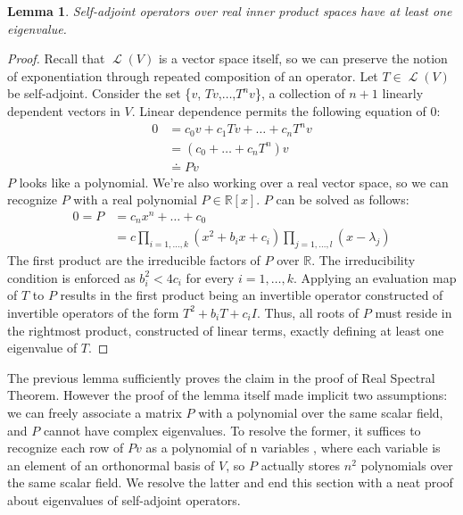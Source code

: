 \documentclass[letterpaper,12pt]{article}
\newtheorem{lemma}[theorem]{Lemma}
\newcommand{\an}[1]{{\leavevmode\color{red}{#1}}}
\begin{document}
\begin{lemma}
Self-adjoint operators over real inner product spaces have at least one eigenvalue.
\end{lemma}
\an{Again, the above is true for any matrix.}
\begin{proof}
  \an{This proof is sketchy to me; e.g., I don't get what $P$ is about, and I don't understand why irreducibility of real polynomial factors is relevant.}
Recall that $\operatorname{\mathcal{L}}(V)$ is a vector space itself, so we can preserve the notion of exponentiation through repeated composition of an operator. Let $T \in \operatorname{\mathcal{L}}(V)$ be self-adjoint. Consider the set \{$v$, $Tv$,$\dots$,$T^{n}v$\}, a collection of $n+1$ linearly dependent vectors in $V$. Linear dependence permits the following equation of 0:
\begin{align}
    0 &= c_0 v + c_1 Tv +\dots+ c_n T^{n}v\\
      &= (c_0 +\dots+c_n T^{n})v \\
      &\doteq Pv
\end{align}
$P$ looks like a polynomial. We're also working over a real vector space, so we can recognize $P$ with a real polynomial $P\in \mathbb{R}[x]$. $P$ can be solved as follows:
\begin{align}
    0 = P &= c_n x^{n} +\dots+c_0 \\
    &= c\prod_{i=1,\dots,k}(x^{2} + b_{i}x + c_{i})\prod_{j=1,\dots,l}(x-\lambda_j) 
\end{align}
The first product are the irreducible factors of $P$ over $\mathbb{R}$. The irreducibility condition is enforced as $b_{i}^{2}<4c_{i}$ for every $i=1,\dots,k$. Applying an evaluation map of $T$ to $P$ results in the first product being an invertible operator constructed of invertible operators of the form $T^{2} + b_{i}T + c_{i}I$. Thus, all roots of $P$ must reside in the rightmost product, constructed of linear terms, exactly defining at least one eigenvalue of $T$.
\end{proof}
The previous lemma sufficiently proves the claim in the proof of Real Spectral Theorem. However the proof of the lemma itself made implicit two assumptions: we can freely associate a matrix $P$ with a polynomial over the same scalar field, and $P$ cannot have complex eigenvalues. To resolve the former, it suffices to recognize each row of $Pv$ as a polynomial of n variables \an{what variables?}, where each variable is an element of an orthonormal basis of $V$, so $P$ actually stores $n^{2}$ polynomials over the same scalar field. We resolve the latter and end this section with a neat proof about eigenvalues of self-adjoint operators.
\end{document}
